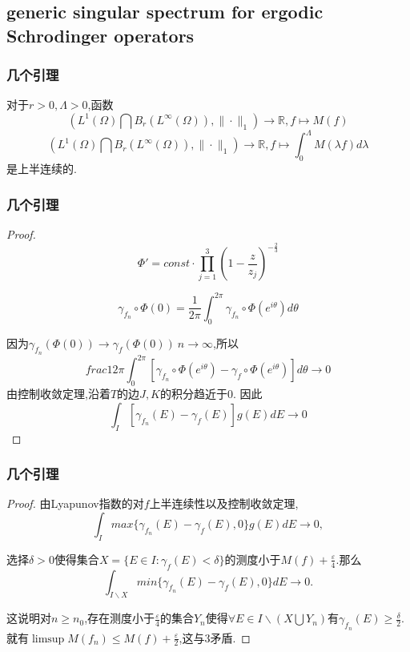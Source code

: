 \documentclass[compress,mathserif,red]{beamer}
\begin{document}
\subsection{generic singular spectrum for ergodic Schrodinger operators} %
\begin{frame}
\frametitle{几个引理}
\begin{lemma}
对于$r>0,\Lambda>0$,函数
$$(L^1(\Omega)\bigcap B_r(L^{\infty}(\Omega)),\| \cdot \|_1)\rightarrow \mathbb{R}, f\mapsto M(f)$$
$$(L^1(\Omega)\bigcap B_r(L^{\infty}(\Omega)),\| \cdot \|_1)\rightarrow \mathbb{R}, f\mapsto \int^{\Lambda}_0 M(\lambda f)d\lambda $$
是上半连续的.

\end{lemma}
\end{frame}

\begin{frame}


\frametitle{几个引理}
\begin{proof}
$$\Phi'=const \cdot \prod_{j=1}^{3}{(1-\frac{z}{z_j})}^{-\frac{2}{3}}$$

$$\gamma_{f_n}\circ \Phi(0)=\frac{1}{2\pi}\int^{2\pi}_0 \gamma_{f_n}\circ \Phi(e^{i\theta})d\theta$$

因为$\gamma_{f_n}(\Phi(0))\rightarrow \gamma_f(\Phi(0)) \ n\to\infty$,所以
$$frac{1}{2\pi}\int^{2\pi}_0[\gamma_{f_n}\circ \Phi(e^{i\theta})-\gamma_{f}\circ \Phi(e^{i\theta})]d\theta \to 0$$
由控制收敛定理,沿着$T$的边$J,K$的积分趋近于$0$.
因此
$$\int_I[\gamma_{f_n}(E)-\gamma_f(E)]g(E)dE\to 0$$

\end{proof}
\end{frame}

\begin{frame}


\frametitle{几个引理}
\begin{proof}
由Lyapunov指数的对$f$上半连续性以及控制收敛定理,
$$\int_I max\{ \gamma_{f_n}(E)-\gamma_f(E),0 \}g(E)dE\to 0,$$

选择$\delta>0$使得集合$X=\{E \in I:\gamma_f(E)<\delta \}$的测度小于$M(f)+\frac{\varepsilon}{4}$.那么
$$\int_{I\backslash X}min\{\gamma_{f_n}(E)-\gamma_f(E),0\}dE\to 0.$$

这说明对$n \geq n_0$,存在测度小于$\frac{\varepsilon}{4}$的集合$Y_n$使得$\forall E\in I\backslash (X\bigcup Y_n)$有$\gamma_{f_n}(E) \geq \frac{\delta}{2}$.就有$\limsup M(f_n) \leq M(f)+\frac{\varepsilon}{2}$,这与3矛盾.

\end{proof}
\end{frame}
\end{document}
